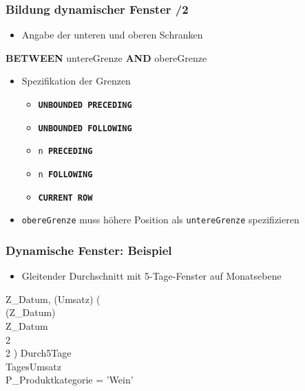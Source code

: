     \begin{frame}
    
    \frametitle{Bildung dynamischer Fenster /2}
    \begin{itemize}
    \item Angabe der unteren und oberen Schranken
    \end{itemize}
      \begin{sql}
        \textbf{BETWEEN} untereGrenze \textbf{AND} obereGrenze
      \end{sql}
      \begin{itemize}
    \item Spezifikation der Grenzen
      \begin{itemize}
      \item \texttt{\textbf{UNBOUNDED PRECEDING}}
      \item \texttt{\textbf{UNBOUNDED FOLLOWING}}
      \item \texttt{n \textbf{PRECEDING}}
      \item \texttt{n \textbf{FOLLOWING}}
      \item \texttt{\textbf{CURRENT ROW}}
      \end{itemize}
    \item \texttt{obereGrenze} muss höhere Position als
      \texttt{untereGrenze} spezifizieren
    \end{itemize}
    
    \end{frame}
    
    \begin{frame}
    
    \frametitle{Dynamische Fenster: Beispiel}
    
    \begin{itemize}
    \item Gleitender Durchschnitt mit 5-Tage-Fenster auf Monatsebene
    \end{itemize}
    
    \begin{sql}
          Z\_Datum, (Umsatz) (\\
        \2		(Z\_Datum) \\
        \2		 Z\_Datum \\
        \2		 2  \\
        \2		 2 )  Durch5Tage\\
          TagesUmsatz \\
     P\_Produktkategorie = 'Wein'
      \end{sql}
    
    \end{frame}
    
